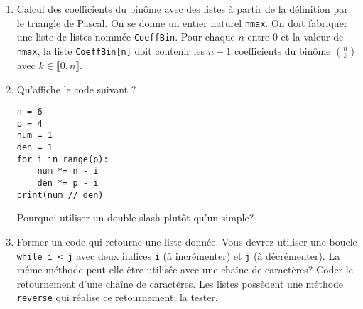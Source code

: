 \begin{enumerate}
  \item Calcul des coefficients du binôme avec des listes à partir de la définition par le triangle de Pascal.\newline
On se donne un entier naturel \texttt{nmax}. On doit fabriquer une liste de listes nommée \texttt{CoeffBin}. Pour chaque $n$ entre 0 et la valeur de \texttt{nmax}, la liste \texttt{CoeffBin[n]} doit contenir les $n+1$ coefficients du binôme $\binom{n}{k}$ avec $k\in \llbracket 0,n\rrbracket$.

 \item Qu'affiche le code suivant ?
\begin{verbatim}
n = 6
p = 4
num = 1
den = 1
for i in range(p):
    num *= n - i
    den *= p - i
print(num // den)\end{verbatim}
Pourquoi utiliser un double slash plutôt qu'un simple?

\item Former un code qui retourne une liste donnée. Vous devrez utiliser une boucle \texttt{while  i < j} avec deux indices \texttt{i} (à incrémenter) et \texttt{j} (à décrémenter).  La même méthode peut-elle être utilisée avec une chaîne de caractères? Coder le retournement d'une chaîne de caractères.\newline
Les listes possèdent une méthode \texttt{reverse} qui réalise ce retournement; la tester.
 \end{enumerate}
